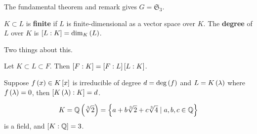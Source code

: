 The fundamental theorem and remark gives $ G = \mathfrak{S}_3 $.


\begin{definition}
$ K \subset L $ is \textbf{finite} if $ L $ is finite-dimensional as a vector space over $ K $. The \textbf{degree} of $ L $ over $ K $ is $ \sb{L : K} = \dim_{K}\rb{L} $.
\end{definition}

Two things about this.

\begin{theorem}
\label{thm:towerlaw}
Let $ K \subset L \subset F $. Then $ \sb{F : K} = \sb{F : L}\sb{L : K} $.
\end{theorem}

\begin{theorem}
\label{thm:degree}
Suppose $ f\rb{x} \in K\sb{x} $ is irreducible of degree $ d = \deg\rb{f} $ and $ L = K\rb{\lambda} $ where $ f\rb{\lambda} = 0 $, then $ \sb{K\rb{\lambda} : K} = d $.
\end{theorem}

\begin{example*}
$$ K = \Q\rb{\sqrt[3]{2}} = \cb{a + b\sqrt[3]{2} + c\sqrt[3]{4} \mid a, b, c \in \Q} $$
is a field, and $ \sb{K : \Q} = 3 $.
\end{example*}


